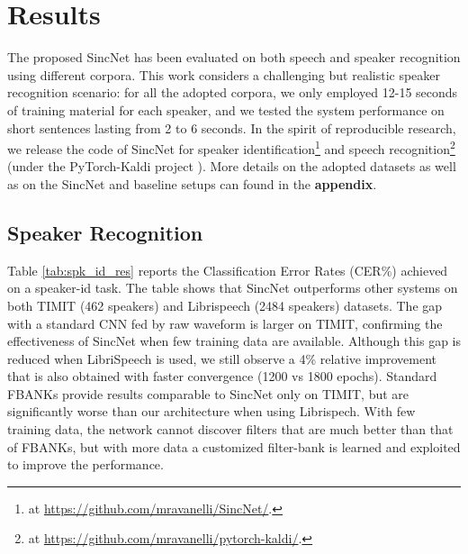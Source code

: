\documentclass{article}
\begin{document}
\section{Results} \label{sec:exp}
The proposed SincNet has been evaluated on both speech and speaker recognition using different corpora. This work considers a challenging but realistic speaker recognition scenario: for all the adopted corpora, we only employed 12-15 seconds of training material for each speaker, and we tested the system performance on short sentences lasting from 2 to 6 seconds.
In the spirit of reproducible research, we release the code of SincNet for speaker identification\footnote{\label{foot:code} at \url{https://github.com/mravanelli/SincNet/}.} and speech recognition\footnote{\label{foot:code} at \url{https://github.com/mravanelli/pytorch-kaldi/}.} (under the PyTorch-Kaldi project \cite{pytorch_kaldi}). More details on the adopted datasets as well as on the SincNet and baseline setups can found in the \textbf{appendix}.

\subsection{Speaker Recognition}

Table \ref{tab:spk_id_res} reports the Classification Error Rates (CER\%) achieved on a speaker-id task. The table shows that  SincNet outperforms other systems on both TIMIT (462 speakers) and Librispeech (2484 speakers) datasets. The gap with a standard CNN fed by raw waveform is larger on TIMIT, confirming the effectiveness of SincNet when few training data are available. Although this gap is reduced when LibriSpeech is used, we still observe a 4\% relative improvement that is also obtained with faster convergence (1200 vs 1800 epochs). 
Standard FBANKs provide results comparable to SincNet only on TIMIT, but are significantly worse than our architecture when using Librispech. With few training data, the network cannot discover filters that are much better than that of FBANKs, but with more data a customized filter-bank is learned and exploited to improve the performance.
\end{document}

